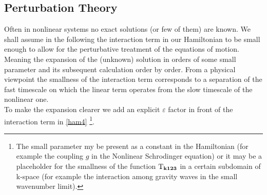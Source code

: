 \subsection{Perturbation Theory}

Often in nonlinear systems no exact solutions (or few of them) are known. We shall assume in the following the interaction term in our Hamiltonian 
to be small enough to allow for the perturbative treatment of the equations of motion. Meaning the expansion of the (unknown) solution in orders of some small parameter and its subsequent calculation order by order. From a physical viewpoint the smallness of the interaction term corresponds to a 
separation of the fast timescale on which the linear term operates from the slow timescale of the nonlinear one.\\
To make the expansion clearer we add an explicit $\varepsilon$ factor in front of the interaction term in \eqref{ham4}
\footnote{The small parameter my be present as a constant in the Hamiltonian (for example the coupling $g$ in the Nonlinear Schrodinger equation) or 
it may be a placeholder for the smallness of the function $\mathrm{T}_{\mathbf{k123}}$ in a certain subdomain of k-space (for example the interaction among gravity waves in 
the small wavenumber limit).}. \\

